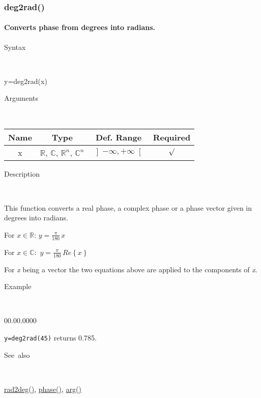 \newpage
\subsubsection*{\hypertarget{deg2rad}{}{\Large deg2rad()}}


\paragraph{\label{par:deg2rad}Converts phase from degrees into radians.}

\begin{description}
\item [Syntax]~
\end{description}
y=deg2rad(x)

\begin{description}
\item [Arguments]~
\end{description}
\begin{tabular}{|c|c|c|c|}
\hline 
Name&
Type&
Def. Range&
Required\tabularnewline
\hline
\hline 
x&
$\mathbb{R}$, $\mathbb{C}$, $\mathbb{R}^{n}$, $\mathbb{C}^{n}$ &
$\left]-\infty,+\infty\right[$&
$\surd$\tabularnewline
\hline
\end{tabular}

\begin{description}
\item [Description]~
\end{description}
This function converts a real phase, a complex phase or a phase vector
given in degrees into radians. 

\medskip{}
For $x\in\mathbb{R}$: $y={\displaystyle \frac{\pi}{180}}\, x$
\medskip{}

For $x\mathbb{\mathbb{\in C}}:$ $y={\displaystyle \frac{\pi}{180}}\, Re\left\{ x\right\} $
\medskip{}

\noindent For \textit{x} being a vector the two equations above are
applied to the components of \textit{x}.

\begin{description}
\item [Example]~
\end{description}
\begin{lyxlist}{00.00.0000}
\item [\texttt{y=deg2rad(45)}]returns 0.785.
\end{lyxlist}
\begin{description}
\item [See~also]~
\end{description}
\textcolor{blue}{\hyperlink{rad2deg}{rad2deg()}}, \textcolor{blue}{\hyperlink{phase}{phase()}},
\textcolor{blue}{\hyperlink{arg}{arg()}}


